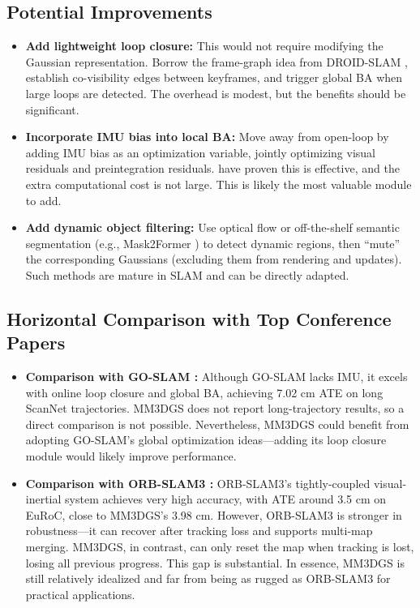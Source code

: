 \documentclass[12pt,a4paper,onecolumn]{article}
\begin{document}
\subsection{Potential Improvements}

\begin{itemize}
    \item \textbf{Add lightweight loop closure:} This would not require modifying the Gaussian representation. Borrow the frame-graph idea from DROID-SLAM \citep{DROID-SLAM}, establish co-visibility edges between keyframes, and trigger global BA when large loops are detected. The overhead is modest, but the benefits should be significant.

    \item \textbf{Incorporate IMU bias into local BA:} Move away from open-loop by adding IMU bias as an optimization variable, jointly optimizing visual residuals and preintegration residuals. \citet{ORB-SLAM3} have proven this is effective, and the extra computational cost is not large. This is likely the most valuable module to add.

    \item \textbf{Add dynamic object filtering:} Use optical flow or off-the-shelf semantic segmentation (e.g., Mask2Former \citep{Mask2Former}) to detect dynamic regions, then ``mute'' the corresponding Gaussians (excluding them from rendering and updates). Such methods are mature in SLAM and can be directly adapted.
\end{itemize}

\subsection{Horizontal Comparison with Top Conference Papers}

\begin{itemize}
    \item \textbf{Comparison with GO-SLAM \citep{GO-SLAM}:} Although GO-SLAM lacks IMU, it excels with online loop closure and global BA, achieving 7.02 cm ATE on long ScanNet trajectories. MM3DGS does not report long-trajectory results, so a direct comparison is not possible. Nevertheless, MM3DGS could benefit from adopting GO-SLAM's global optimization ideas—adding its loop closure module would likely improve performance.

    \item \textbf{Comparison with ORB-SLAM3 \citep{ORB-SLAM3}:} ORB-SLAM3's tightly-coupled visual-inertial system achieves very high accuracy, with ATE around 3.5 cm on EuRoC, close to MM3DGS's 3.98 cm. However, ORB-SLAM3 is stronger in robustness—it can recover after tracking loss and supports multi-map merging. MM3DGS, in contrast, can only reset the map when tracking is lost, losing all previous progress. This gap is substantial. In essence, MM3DGS is still relatively idealized and far from being as rugged as ORB-SLAM3 for practical applications.
\end{itemize}
\end{document}
